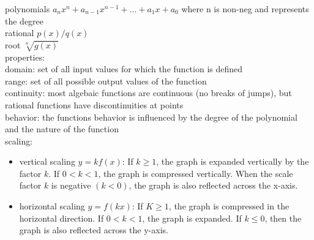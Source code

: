 \documentclass{article}
\begin{document}
polynomials $a_nx^n + a_{n-1}x^{n-1} + ... + a_1x + a_0$ where n is non-neg and represents the degree\\

rational $p(x)/q(x)$\\

root $\sqrt[n]{g(x)}$\\

properties:\\
	domain: set of all input values for which the function is defined\\
	range: set of all possible output values of the function\\
	
	continuity: most algebaic functions are continuous (no breaks of jumps), but rational functions have discontinuities at points\\
		
	behavior: the functions behavior is influenced by the degree of the polynomial and the nature of the function\\


	scaling:
		\begin{itemize}
			\item{vertical scaling} $y = kf(x)$: If $k \geq 1$, the graph is expanded vertically by the factor $k$. If $0 < k < 1$, the graph is compressed vertically. When the scale factor $k$ is negative $(k < 0)$, the graph is also reflected across the x-axis.
			\item{horizontal scaling} $y = f(kx)$: If $K \geq 1$, the graph is compressed in the horizontal direction. If $0 < k < 1$, the graph is expanded. If $k \leq 0$, then the graph is also reflected across the y-axis.
		\end{itemize}
\end{document}
